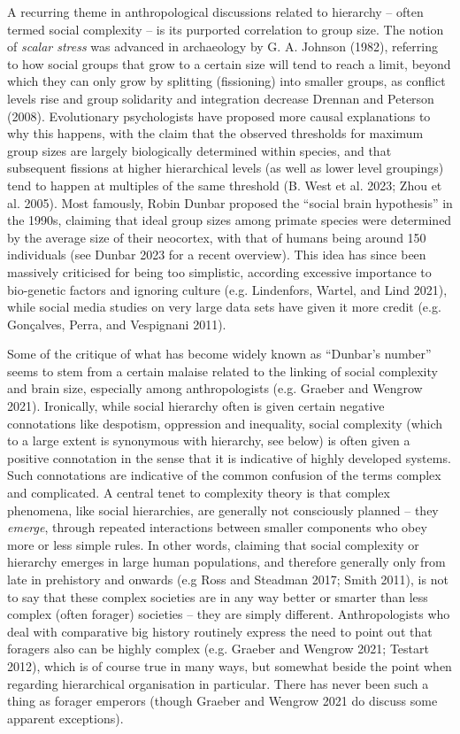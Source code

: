 \documentclass[
  12pt,
  a4paper, twoside]{book}
\begin{document}
A recurring theme in anthropological discussions related to hierarchy -- often termed social complexity -- is its purported correlation to group size. The notion of \emph{scalar stress} was advanced in archaeology by G. A. Johnson (1982), referring to how social groups that grow to a certain size will tend to reach a limit, beyond which they can only grow by splitting (fissioning) into smaller groups, as conflict levels rise and group solidarity and integration decrease Drennan and Peterson (2008). Evolutionary psychologists have proposed more causal explanations to why this happens, with the claim that the observed thresholds for maximum group sizes are largely biologically determined within species, and that subsequent fissions at higher hierarchical levels (as well as lower level groupings) tend to happen at multiples of the same threshold (B. West et al. 2023; Zhou et al. 2005). Most famously, Robin Dunbar proposed the ``social brain hypothesis'' in the 1990s, claiming that ideal group sizes among primate species were determined by the average size of their neocortex, with that of humans being around 150 individuals (see Dunbar 2023 for a recent overview). This idea has since been massively criticised for being too simplistic, according excessive importance to bio-genetic factors and ignoring culture (e.g. Lindenfors, Wartel, and Lind 2021), while social media studies on very large data sets have given it more credit (e.g. Gonçalves, Perra, and Vespignani 2011).

Some of the critique of what has become widely known as ``Dunbar's number'' seems to stem from a certain malaise related to the linking of social complexity and brain size, especially among anthropologists (e.g. Graeber and Wengrow 2021). Ironically, while social hierarchy often is given certain negative connotations like despotism, oppression and inequality, social complexity (which to a large extent is synonymous with hierarchy, see below) is often given a positive connotation in the sense that it is indicative of highly developed systems. Such connotations are indicative of the common confusion of the terms complex and complicated. A central tenet to complexity theory is that complex phenomena, like social hierarchies, are generally not consciously planned -- they \emph{emerge}, through repeated interactions between smaller components who obey more or less simple rules. In other words, claiming that social complexity or hierarchy emerges in large human populations, and therefore generally only from late in prehistory and onwards (e.g Ross and Steadman 2017; Smith 2011), is not to say that these complex societies are in any way better or smarter than less complex (often forager) societies -- they are simply different. Anthropologists who deal with comparative big history routinely express the need to point out that foragers also can be highly complex (e.g. Graeber and Wengrow 2021; Testart 2012), which is of course true in many ways, but somewhat beside the point when regarding hierarchical organisation in particular. There has never been such a thing as forager emperors (though Graeber and Wengrow 2021 do discuss some apparent exceptions).
\end{document}
